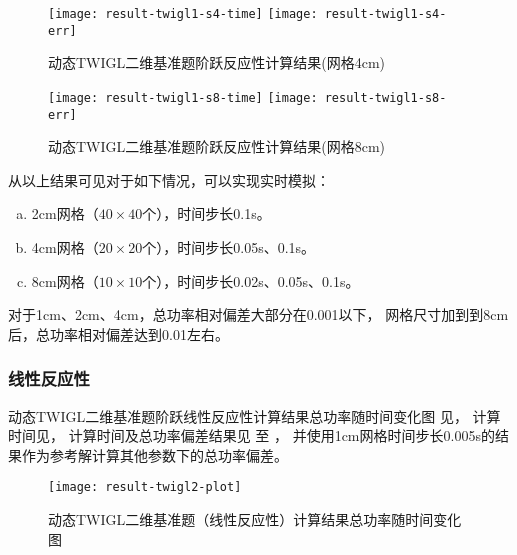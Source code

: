 \begin{figure}[H]
\centering
\texttt{[image: result-twigl1-s4-time]}
\texttt{[image: result-twigl1-s4-err]}
\caption{动态TWIGL二维基准题阶跃反应性计算结果(网格4cm)\label{fig:testresult.twigl.1.4}}
\end{figure}

\begin{figure}[H]
\centering
\texttt{[image: result-twigl1-s8-time]}
\texttt{[image: result-twigl1-s8-err]}
\caption{动态TWIGL二维基准题阶跃反应性计算结果(网格8cm)\label{fig:testresult.twigl.1.8}}
\end{figure}

从以上结果可见对于如下情况，可以实现实时模拟：
\begin{enumerate}[a)]
\item 2cm网格（$40\times40$个），时间步长0.1s。
\item 4cm网格（$20\times20$个），时间步长0.05s、0.1s。
\item 8cm网格（$10\times10$个），时间步长0.02s、0.05s、0.1s。
\end{enumerate}
对于1cm、2cm、4cm，总功率相对偏差大部分在0.001以下，
网格尺寸加到到8cm后，总功率相对偏差达到0.01左右。

\FloatBarrier

\subsubsection{线性反应性}

动态TWIGL二维基准题阶跃线性反应性计算结果总功率随时间变化图
见，
计算时间见，
计算时间及总功率偏差结果见
至
，
并使用1cm网格时间步长0.005s的结果作为参考解计算其他参数下的总功率偏差。

\begin{figure}[H]
\centering
\texttt{[image: result-twigl2-plot]}
\caption{动态TWIGL二维基准题（线性反应性）计算结果总功率随时间变化图\label{fig:testresult.twigl.2.plot}}
\end{figure}

